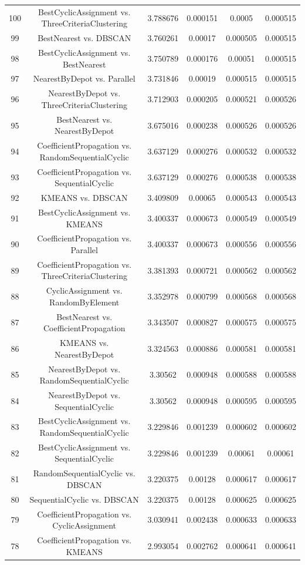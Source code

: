 \documentclass[a4paper,10pt]{article}
\begin{document}
\begin{landscape}
\begin{table}[!htp]
\begin{tabular}{cccccc}
100&BestCyclicAssignment vs. ThreeCriteriaClustering&3.788676&0.000151&0.0005&0.000515\\
99&BestNearest vs. DBSCAN&3.760261&0.00017&0.000505&0.000515\\
98&BestCyclicAssignment vs. BestNearest&3.750789&0.000176&0.00051&0.000515\\
97&NearestByDepot vs. Parallel&3.731846&0.00019&0.000515&0.000515\\
96&NearestByDepot vs. ThreeCriteriaClustering&3.712903&0.000205&0.000521&0.000526\\
95&BestNearest vs. NearestByDepot&3.675016&0.000238&0.000526&0.000526\\
94&CoefficientPropagation vs. RandomSequentialCyclic&3.637129&0.000276&0.000532&0.000532\\
93&CoefficientPropagation vs. SequentialCyclic&3.637129&0.000276&0.000538&0.000538\\
92&KMEANS vs. DBSCAN&3.409809&0.00065&0.000543&0.000543\\
91&BestCyclicAssignment vs. KMEANS&3.400337&0.000673&0.000549&0.000549\\
90&CoefficientPropagation vs. Parallel&3.400337&0.000673&0.000556&0.000556\\
89&CoefficientPropagation vs. ThreeCriteriaClustering&3.381393&0.000721&0.000562&0.000562\\
88&CyclicAssignment vs. RandomByElement&3.352978&0.000799&0.000568&0.000568\\
87&BestNearest vs. CoefficientPropagation&3.343507&0.000827&0.000575&0.000575\\
86&KMEANS vs. NearestByDepot&3.324563&0.000886&0.000581&0.000581\\
85&NearestByDepot vs. RandomSequentialCyclic&3.30562&0.000948&0.000588&0.000588\\
84&NearestByDepot vs. SequentialCyclic&3.30562&0.000948&0.000595&0.000595\\
83&BestCyclicAssignment vs. RandomSequentialCyclic&3.229846&0.001239&0.000602&0.000602\\
82&BestCyclicAssignment vs. SequentialCyclic&3.229846&0.001239&0.00061&0.00061\\
81&RandomSequentialCyclic vs. DBSCAN&3.220375&0.00128&0.000617&0.000617\\
80&SequentialCyclic vs. DBSCAN&3.220375&0.00128&0.000625&0.000625\\
79&CoefficientPropagation vs. CyclicAssignment&3.030941&0.002438&0.000633&0.000633\\
78&CoefficientPropagation vs. KMEANS&2.993054&0.002762&0.000641&0.000641\\

\end{tabular}
\end{table}
\end{landscape}
\end{document}
